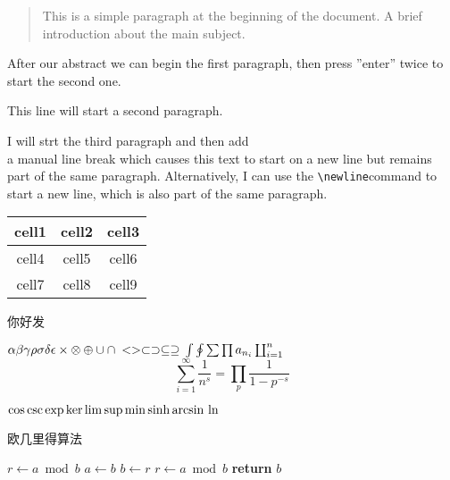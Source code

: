 \documentclass[12pt, letterpaper]{article}
\begin{document}
\begin{abstract} %
This is a simple paragraph at the beginning of the
document. A brief introduction about the main subject.
\end{abstract}

After our abstract we can begin the first paragraph, then press ''enter''
twice to start the second one.

This line will start a second paragraph.

I will strt the third paragraph and then add \\ a manual line break which
causes this text to start on a new line but remains part of the same
paragraph. Alternatively, I can use the \verb|\newline|\newline command to
start a new line, which is also part of the same paragraph.

\begin{center}
\begin{tabular}{|c|c|c|}
    \hline
    cell1 & cell2 & cell3 \\
    \hline
    cell4 & cell5 & cell6 \\
    \hline
    cell7 & cell8 & cell9 \\
    \hline
\end{tabular}
\end{center}

\begin{CJK}{UTF8}{gkai}
    你好发
\end{CJK}

\begin{math}
    \alpha \beta \gamma \rho \sigma \delta \epsilon \\
    \times \otimes \oplus \cup \cap \\
    < > \subset \supset \subseteq \supseteq \\
    \int \oint \sum \prod \\
    a_{n_i}  \coprod_{i=1}^n
\end{math}
\[\sum_{i=1}^{\infty}\frac{1}{n^s} = \prod_p\frac{1}{1 - p ^ {-s}}\]

\begin{math}
    \cos \csc \exp \ker \limsup \min \sinh \arcsin \\
    \ln
\end{math}





\begin{algorithm}
\caption{欧几里得算法}
\begin{algorithmic}[1]
\State $r \gets a \bmod b$
\State $a \gets b$
\State $b \gets r$
\State $r \gets a \bmod b$
\EndWhile
\State \textbf{return} $b$
\EndProcedure
\end{algorithmic}
\end{algorithm}
\end{document}
